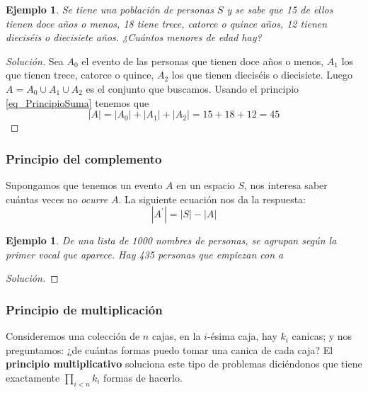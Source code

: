 \documentclass[spanish]{report}
\newtheorem{ejm}[thm]{Ejemplo}
\newcommand{\card}[1]{\left|#1 \right|}
\begin{document}
\begin{ejm}
	Se tiene una población de personas $S$ y se sabe que 15 de ellos tienen doce años o menos, 18 tiene trece, catorce o quince años, 12 tienen dieciséis o diecisiete años. ¿Cuántos menores de edad hay?
\end{ejm}
\begin{proof}[Solución]
	Sea $A_0$ el evento de las personas que tienen doce años o menos, $A_1$ los que tienen trece, catorce o quince, $A_2$ los que tienen dieciséis o diecisiete.
	Luego $A = A_0 \cup A_1 \cup A_2$ es el conjunto que buscamos. Usando el principio \ref{eq_PrincipioSuma} tenemos que \[\card{A} = \card{A_0}+\card{A_1}+\card{A_2} = 15+18+12= 45\]
\end{proof}

\subsubsection{Principio del complemento} %

Supongamos que tenemos un evento $A$ en un espacio $S$, nos interesa saber cuántas veces no \emph{ocurre} $A$. La siguiente ecuación nos da la respuesta:
\begin{equation}\label{eq_PrincipioComplemento}
	\card{A^\prime} = \card{S} - \card{A}
\end{equation}

\begin{ejm}
	De una lista de 1000 nombres de personas, se agrupan según la primer vocal que aparece. Hay 435 personas que empiezan con \emph{a} %
\end{ejm}
\begin{proof}[Solución]
\end{proof}


\subsubsection{Principio de multiplicación}
Consideremos una colección de $n$ cajas, en la $i$-ésima caja, hay $k_i$ canicas; y nos preguntamos: ¿de cuántas formas puedo tomar una canica de cada caja?
El \textbf{principio multiplicativo} soluciona este tipo de problemas diciéndonos que tiene exactamente $\prod_{i<n}k_i$ formas de hacerlo.
\end{document}
